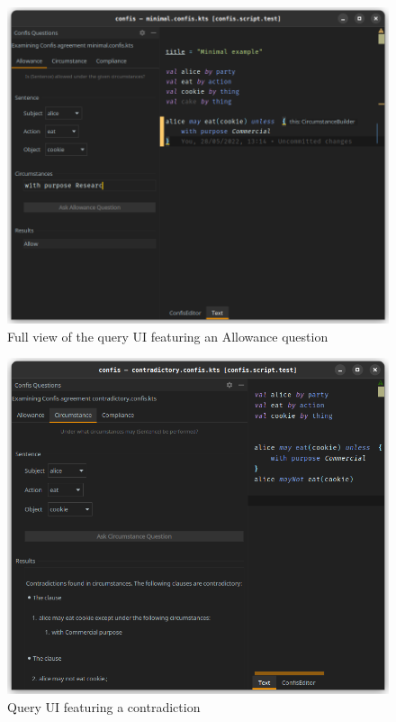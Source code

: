 \begin{figure}[h]
    \centering
    \includegraphics[width=\textwidth]{figures/queryUIWindow}
    \caption{Full view of the query UI featuring an Allowance question}
    \label{fig:queryUi-window}
\end{figure}

\begin{figure}[h]
    \centering
    \includegraphics[width=\textwidth]{figures/confis.editor-contradictory}
    \caption{Query UI featuring a contradiction}
    \label{fig:queryUi-contradiction}
\end{figure}

